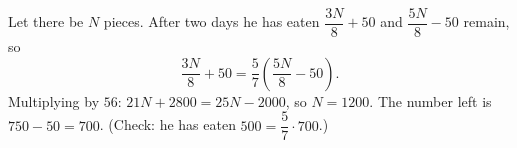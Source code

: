 Let there be $N$ pieces. After two days he has eaten $\dfrac{3N}8+50$ and $\dfrac{5N}8-50$ remain, so
\[\dfrac{3N}{8}+50=\dfrac57\left(\dfrac{5N}{8}-50\right).\]
Multiplying by $56$: $21N+2800=25N-2000$, so $N=1200$. The number left is $750-50=\boxed{700}$. (Check: he has eaten $500=\dfrac57\cdot700$.)
